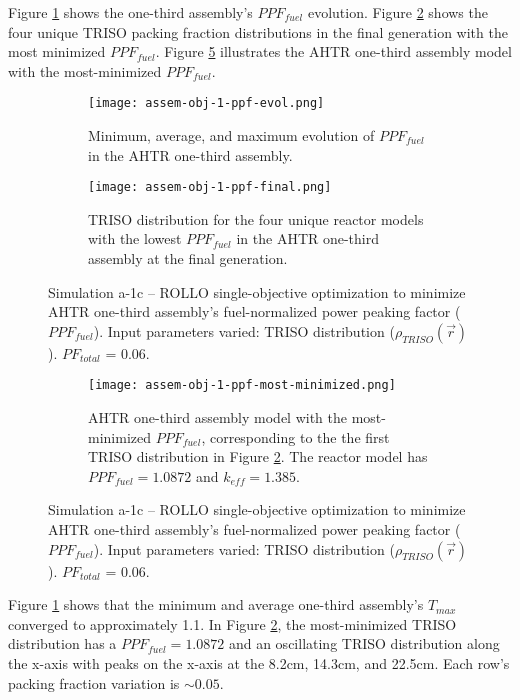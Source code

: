 Figure \ref{fig:assem-obj-1-ppf-evol} shows the one-third assembly's $PPF_{fuel}$ 
evolution. 
Figure \ref{fig:assem-obj-1-ppf-final} shows the four unique TRISO packing fraction 
distributions in the final generation with the most minimized $PPF_{fuel}$. 
Figure \ref{fig:assem-obj-1-ppf-most-minimized} illustrates the \gls{AHTR} one-third 
assembly model with the most-minimized $PPF_{fuel}$. 
\begin{figure}[htbp!]
    \centering
    \begin{subfigure}{\textwidth}
        \texttt{[image: assem-obj-1-ppf-evol.png]}
        \caption{Minimum, average, and maximum evolution of $PPF_{fuel}$ in the 
        AHTR one-third assembly.}
        \label{fig:assem-obj-1-ppf-evol} 
    \end{subfigure}
    \begin{subfigure}{\textwidth}
        \texttt{[image: assem-obj-1-ppf-final.png]}
        \caption{TRISO distribution for the four unique reactor models with the 
        lowest $PPF_{fuel}$ in the AHTR one-third assembly at the final generation.}
        \label{fig:assem-obj-1-ppf-final} 
    \end{subfigure}
    \caption{Simulation a-1c -- ROLLO single-objective optimization to minimize 
    AHTR one-third assembly's fuel-normalized power peaking factor ($PPF_{fuel}$). 
    Input parameters varied: TRISO distribution ($\rho_{TRISO}(\vec{r})$).
    $PF_{total}$ = 0.06.}
    \label{fig:assem-obj-1-ppf}
\end{figure}
\begin{figure}[htbp!]
    \ContinuedFloat
    \centering
    \begin{subfigure}{\textwidth}
        \texttt{[image: assem-obj-1-ppf-most-minimized.png]}
        \caption{\gls{AHTR} one-third assembly model with the most-minimized 
        $PPF_{fuel}$, corresponding to the the first TRISO distribution in Figure 
        \ref{fig:assem-obj-1-ppf-final}. The reactor model has $PPF_{fuel}=1.0872$
        and $k_{eff}=1.385$.}
        \label{fig:assem-obj-1-ppf-most-minimized} 
    \end{subfigure}
    \caption{Simulation a-1c -- ROLLO single-objective optimization to minimize 
    AHTR one-third assembly's fuel-normalized power peaking factor ($PPF_{fuel}$). 
    Input parameters varied: TRISO distribution ($\rho_{TRISO}(\vec{r})$).
    $PF_{total}$ = 0.06.}
\end{figure}

Figure \ref{fig:assem-obj-1-ppf-evol} shows that the minimum and average 
one-third assembly's $T_{max}$ converged to approximately 1.1.
In Figure \ref{fig:assem-obj-1-ppf-final}, the most-minimized TRISO distribution has 
a $PPF_{fuel} = 1.0872$ and an oscillating TRISO distribution along the x-axis with 
peaks on the x-axis at the 8.2cm, 14.3cm, and 22.5cm. 
Each row's packing fraction variation is $\sim0.05$.

